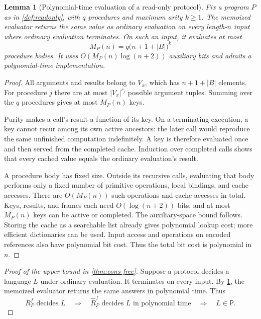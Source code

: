 \documentclass[11pt,twoside]{article}
\newtheorem{lemma}[theorem]{Lemma}
\theoremstyle{definition}
\theoremstyle{remark}
\begin{document}
\begin{lemma}[Polynomial-time evaluation of a read-only protocol]
\label{lem:memoized}
Fix a program $P$ as in \cref{def:readonly}, with $q$ procedures and maximum
arity $k\geq1$. The memoized evaluator returns the same value as ordinary
evaluation on every length-$n$ input where ordinary evaluation terminates.
On such an input, it evaluates at most
\begin{equation}
 M_P(n)=q\bigl(n+1+|B|\bigr)^k
 \label{eq:call-count}
\end{equation}
procedure bodies. It uses $O(M_P(n)\log(n+2))$ auxiliary bits and admits
a polynomial-time implementation.
\end{lemma}
\begin{proof}
All arguments and results belong to $V_x$, which has $n+1+|B|$ elements.
For procedure $j$ there are at most $|V_x|^{r_j}$ possible argument tuples.
Summing over the $q$ procedures gives at most $M_P(n)$ keys.

Purity makes a call's result a function of its key. On a terminating
execution, a key cannot recur among its own active ancestors: the later
call would reproduce the same unfinished computation indefinitely. A key
is therefore evaluated once and then served from the completed cache.
Induction over completed calls shows that every cached value equals the
ordinary evaluation's result.

A procedure body has fixed size. Outside its recursive calls, evaluating
that body performs only a fixed number of primitive operations, local
bindings, and cache accesses. There are $O(M_P(n))$ such operations and
cache accesses in total. Keys, results, and frames each need
$O(\log(n+2))$ bits, and at most $M_P(n)$ keys can be active or completed.
The auxiliary-space bound follows. Storing the cache as a searchable list
already gives polynomial lookup cost; more efficient dictionaries can be
used. Input access and operations on encoded references also have polynomial
bit cost. Thus the total bit cost is polynomial in $n$.
\end{proof}

\begin{proof}[Proof of the upper bound in \cref{thm:cons-free}]
Suppose a protocol decides a language $L$ under ordinary evaluation.
It terminates on every input. By \cref{lem:memoized}, the memoized evaluator
returns the same answers in polynomial time. Thus
\[
 R_P^f\text{ decides }L
 \quad\Longrightarrow\quad
 \widehat R_P^f\text{ decides }L\text{ in polynomial time}
 \quad\Longrightarrow\quad L\in\mathsf P.
\]
\end{proof}
\end{document}
